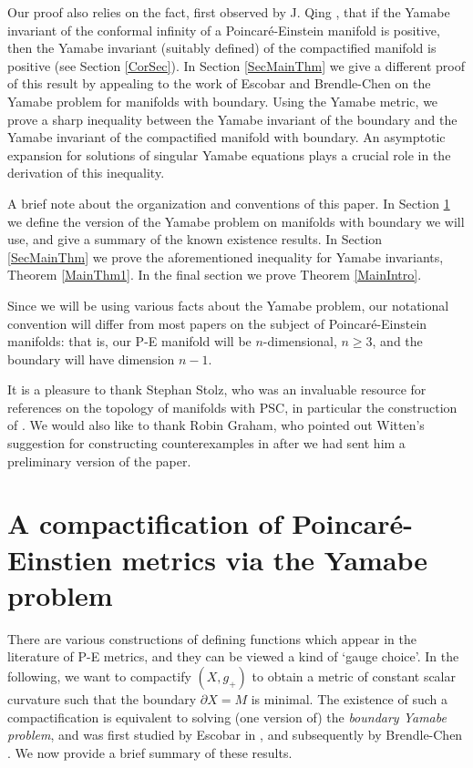 \documentclass{amsart}
\theoremstyle{definition}
\theoremstyle{remark}
\numberwithin{equation}{section}
\begin{document}
Our proof also relies on the fact, first observed by J. Qing \cite{JQ}, that if the Yamabe invariant of the conformal infinity of a Poincar\'e-Einstein manifold is positive, then the Yamabe invariant (suitably defined) of the compactified manifold is positive (see Section \ref{CorSec}).   In Section \ref{SecMainThm} we give a different proof of this result by appealing to the work of Escobar \cite{EscobarJDG} and Brendle-Chen \cite{BC} on the Yamabe problem for manifolds with boundary.  Using the Yamabe metric, we prove a sharp inequality between the Yamabe invariant of the boundary and the Yamabe invariant of the compactified manifold with boundary.  An asymptotic expansion for solutions of singular Yamabe equations plays a crucial role in the derivation of this inequality.

A brief note about the organization and conventions of this paper.  In Section \ref{SecYM} we define the version of the Yamabe problem on manifolds with boundary we will use, and give a summary of the known existence results.  In Section \ref{SecMainThm} we prove the aforementioned inequality for Yamabe invariants, Theorem \ref{MainThm1}.  In the final section we prove Theorem \ref{MainIntro}.

Since we will be using various facts about the Yamabe problem, our notational convention will differ from most papers on the subject of Poincar\'e-Einstein manifolds: that is, our P-E manifold will be $n$-dimensional, $n \geq 3$, and the boundary will have dimension $n-1$.

\smallskip

  It is a pleasure to thank Stephan Stolz, who was an invaluable resource for references on the topology of manifolds with PSC, in particular the construction of \cite{GL}.  We would also like to thank Robin Graham, who pointed out Witten's suggestion for constructing counterexamples in \cite{WittenHolo} after we had sent him a preliminary version of the paper.




\section{A compactification of Poincar\'e-Einstien metrics via the Yamabe problem}  \label{SecYM}



There are various constructions of defining functions which appear in the literature of P-E metrics, and they can be viewed a kind of `gauge choice'.  In the following, we want to compactify $(X,g_{+})$ to obtain a metric of
constant scalar curvature such that the boundary $\partial X = M$ is minimal. The existence of such a compactification is equivalent to solving (one version of) the {\em boundary Yamabe problem}, and was first studied by Escobar in \cite{EscobarJDG}, and subsequently by Brendle-Chen \cite{BC}.   We now provide a brief summary of these results.
\end{document}

